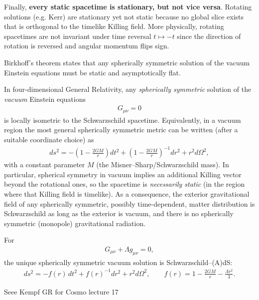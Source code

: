 \begin{mytheorem}
Finally, \textbf{every static spacetime is stationary, but not vice versa}.
Rotating solutions (e.g. Kerr) are stationary yet not static because no global slice exists that is orthogonal to the timelike Killing field.
More physically, rotating spacetimes are not invariant under time reversal $t\mapsto -t$ since the direction of rotation is reversed and angular momentum flips sign.
%
\end{mytheorem}


\begin{mytheorem}
Birkhoff's theorem states that any spherically symmetric solution of the vacuum Einstein equations must be static and asymptotically flat.

In four-dimensional General Relativity, any \emph{spherically symmetric} solution of the \emph{vacuum} Einstein equations
\begin{align}
    G_{\mu\nu} = 0
\end{align}
is locally isometric to the Schwarzschild spacetime. Equivalently, in a vacuum region the most general spherically symmetric metric can be written (after a suitable coordinate choice) as
\begin{align}
    ds^2
    = -\left(1-\frac{2GM}{r}\right)dt^2
      +\left(1-\frac{2GM}{r}\right)^{-1}dr^2
      +r^2 d\Omega^2 ,
\end{align}
with a constant parameter \(M\) (the Misner--Sharp/Schwarzschild mass). In particular, spherical symmetry in vacuum implies an additional Killing vector beyond the rotational ones, so the spacetime is \emph{necessarily static} (in the region where that Killing field is timelike). As a consequence, the exterior gravitational field of any spherically symmetric, possibly time-dependent, matter distribution is Schwarzschild as long as the exterior is vacuum, and there is no spherically symmetric (monopole) gravitational radiation.

For
\begin{align}
    G_{\mu\nu} + \Lambda g_{\mu\nu} = 0 ,
\end{align}
the unique spherically symmetric vacuum solution is Schwarzschild--(A)dS:
\begin{align}
    ds^2
    = -f(r)\,dt^2 + f(r)^{-1}dr^2 + r^2 d\Omega^2,
    \qquad
    f(r)=1-\frac{2GM}{r}-\frac{\Lambda r^2}{3}.
\end{align}
\end{mytheorem}


\begin{mytheorem}
Seee Kempf GR for Cosmo lecture 17
\end{mytheorem}